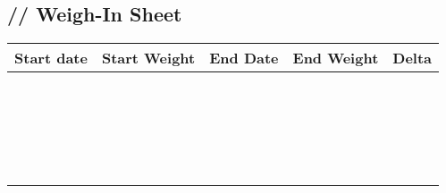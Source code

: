 \documentclass{article}
\begin{document}
\begin{center}
\section*{\hspace{1cm}/\hspace{1cm}/\hspace{1cm} Weigh-In Sheet}
{\setlength{\extrarowheight}{10pt}%
    \begin{tabularx}{\textwidth}{|X|X|X|X|X|}
        \hline
        Start date & Start Weight & End Date & End Weight & Delta \\
        \hline\hline
        & & & &  \\
        \hline
        & & & &  \\
        \hline
        & & & &  \\
        \hline
        & & & &  \\
        \hline
        & & & &  \\
        \hline
        & & & &  \\
        \hline
        & & & &  \\
        \hline
        & & & &  \\
        \hline
        & & & &  \\
        \hline
        & & & &  \\
        \hline
        & & & &  \\
        \hline
        & & & &  \\
        \hline
        & & & &  \\
        \hline
        & & & &  \\
        \hline
        & & & &  \\
        \hline
        & & & &  \\
        \hline
        & & & &  \\
        \hline
        & & & &  \\
        \hline
        & & & &  \\
        \hline
        & & & &  \\
        \hline
        & & & &  \\
        \hline

    \end{tabularx}}
\end{center}
\end{document}
